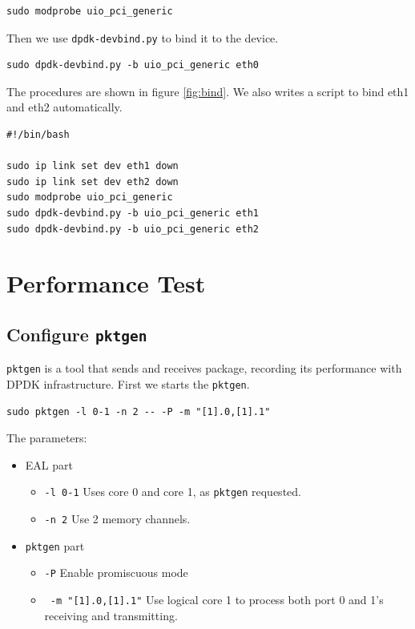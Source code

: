 \documentclass[12pt]{article}
\begin{document}
\begin{lstlisting}
sudo modprobe uio_pci_generic
\end{lstlisting}

Then we use \texttt{dpdk-devbind.py} to bind it to the device.

\begin{lstlisting}
sudo dpdk-devbind.py -b uio_pci_generic eth0
\end{lstlisting}

The procedures are shown in figure \ref{fig:bind}. We also writes a script to bind eth1 and eth2 automatically.

\begin{lstlisting}[caption={bind\_port.sh}]
#!/bin/bash

sudo ip link set dev eth1 down
sudo ip link set dev eth2 down
sudo modprobe uio_pci_generic
sudo dpdk-devbind.py -b uio_pci_generic eth1
sudo dpdk-devbind.py -b uio_pci_generic eth2
\end{lstlisting}

\section{Performance Test}

\subsection{Configure \texttt{pktgen}}

\texttt{pktgen} is a tool that sends and receives package, recording its performance with DPDK infrastructure. First we starts the \texttt{pktgen}.

\begin{lstlisting}
sudo pktgen -l 0-1 -n 2 -- -P -m "[1].0,[1].1"
\end{lstlisting}

The parameters:

\begin{itemize}
    \item EAL part
    \begin{itemize}
        \item \texttt{-l 0-1} Uses core 0 and core 1, as \texttt{pktgen} requested.
        \item \texttt{-n 2} Use 2 memory channels.
    \end{itemize}
    \item \texttt{pktgen} part
    \begin{itemize}
        \item \texttt{-P} Enable promiscuous mode
        \item \texttt{ -m "[1].0,[1].1"} Use logical core 1 to process both port 0 and 1's receiving and transmitting.
    \end{itemize}
\end{itemize}
\end{document}
